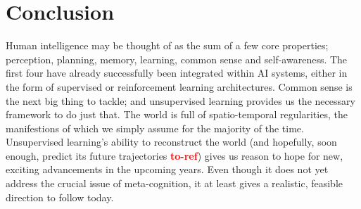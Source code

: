 \documentclass[]{article}
\newcommand\toref{\textcolor{red}{\bf{to-ref}}}
\begin{document}
\section{Conclusion}
Human intelligence may be thought of as the sum of a few core properties; perception, planning, memory, learning, common sense and self-awareness. The first four have already successfully been integrated within AI systems, either in the form of supervised or reinforcement learning architectures. Common sense is the next big thing to tackle; and unsupervised learning provides us the necessary framework to do just that. The world is full of spatio-temporal regularities, the manifestions of which we simply assume for the majority of the time. Unsupervised learning's ability to reconstruct the world (and hopefully, soon enough, predict its future trajectories \toref ) gives us reason to hope for new, exciting advancements in the upcoming years. Even though it does not yet address the crucial issue of meta-cognition, it at least gives a realistic, feasible direction to follow today.


\end{document}

